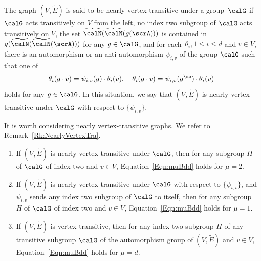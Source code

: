 \begin{definition}
\label{Defn:NearlyVertexTra}
The graph $(V, \widetilde E)$ is said to be \textnormal{nearly vertex-transitive under a group}~$\calG$ if $\calG$ acts transitively on $V$ from the left, no index two subgroup of $\calG$ acts transitively on $V$, the set 
$
\widetilde \calN (\widetilde \calN(g(\scrA)))$ 
is contained in 
$g(\widetilde \calN(\widetilde \calN(\scrA)))
$ 
for any $g\in \calG$, and for each~$\theta_i, 1\leq i\leq d$ and $v\in V$, there is an automorphism or an anti-automorphism $\psi_{i,v}$ of the group $\calG$ such that one of 
$$\theta_i(g\cdot v) =  \psi_{i,v}(g) \cdot \theta_i(v), 
\quad 
\theta_i(g\cdot v) =  \psi_{i, v}(g^\mo) \cdot \theta_i(v)$$
holds for any $g\in \calG$. In this situation, we say that $(V, \widetilde E)$ is \textnormal{nearly vertex-transitive under $\calG$ with respect to} $\{\psi_{i,v}\}$.
\end{definition}

It is worth considering nearly vertex-transitive graphs. We refer to Remark~\ref{Rk:NearlyVertexTra}. 

\begin{proposition}
\label{Prop:Mu12d}
\quad
\begin{enumerate}
\item 
If $(V, \widetilde E)$ is nearly vertex-transitive under $\calG$, then for any subgroup $H$ of $\calG$ of index two and $v\in V$, Equation~\eqref{Eqn:muBdd} holds for $\mu = 2$. 
\item 
If $(V, \widetilde E)$ is nearly vertex-transitive under $\calG$ with respect to $\{\psi_{i,v}\}$, and $\psi_{i, v}$ sends any index two subgroup of $\calG$ to itself, then for any subgroup $H$ of $\calG$ of index two and $v\in V$, Equation~\eqref{Eqn:muBdd} holds for $\mu = 1$. 
\item 
If $(V, \widetilde E)$ is vertex-transitive, then for any index two subgroup $H$ of any transitive subgroup $\calG$ of the automorphism group of $(V, \widetilde E)$ and $v\in V$, Equation~\eqref{Eqn:muBdd} holds for $\mu = d$. 
\end{enumerate}
\end{proposition}

